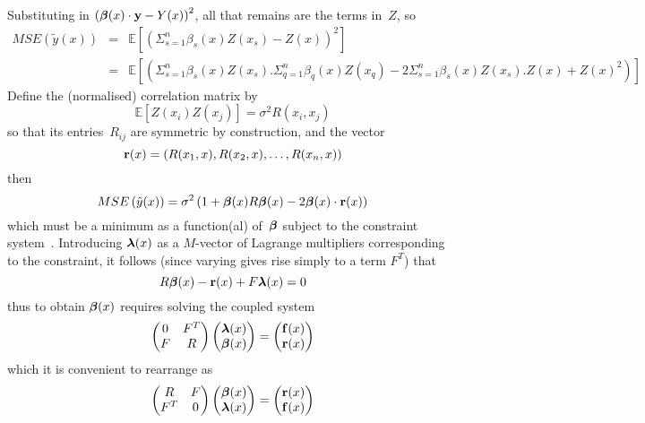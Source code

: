 Substituting  in $\left( \mbox{\boldmath ${\beta}$}(x)\cdot{\bf y} - Y(x) \right)^2$, all that remains are the
terms in~$Z$, so
\begin{eqnarray}
MSE\left(\tilde{y}(x)\right) &=& \mathbb{E} [ \left( \Sigma^n_{s=1} \beta_s(x) Z(x_s) - Z(x) \right)^2 ] \\
&=& \mathbb{E} [ \left( \Sigma^n_{s=1} \beta_s(x) Z(x_s) . \Sigma^n_{q=1} \beta_q(x) Z(x_q) -2 \Sigma^n_{s=1} \beta_s(x) Z(x_s) . Z(x) + Z(x)^2 \right) ] 
\end{eqnarray}
Define the (normalised) correlation matrix by
\begin{equation}
\mathbb{E} [ Z(x_i) Z(x_j) ]= \sigma^2 R(x_i,x_j) 
\end{equation}
so that its entries~$R_{ij}$ are symmetric by construction, and the vector
\begin{equation}
{\bf r}(x)=\left( R(x_1,x), R(x_2,x),\ldots,R(x_n,x) \right)
\end{equation}
then
\begin{equation}\label{eq:msend}
MSE\left(\tilde{y}(x)\right) = \sigma^2\left(1+ \mbox{\boldmath ${\beta}$}(x) R \mbox{\boldmath ${\beta}$}(x) - 2 \mbox{\boldmath ${\beta}$}(x)\cdot{\bf r}(x) \right) 
\end{equation}
which must be a minimum as a function(al) of~$\mbox{\boldmath ${\beta}$}$ subject to the constraint system~.
Introducing $\mbox{\boldmath ${\lambda}$}(x)$ as a $M$-vector of Lagrange multipliers corresponding to the constraint,
it follows (since varying  gives rise simply to a term $F^T$) that
\begin{equation}\label{eq:mat2}
R \mbox{\boldmath ${\beta}$}(x) -{\bf r}(x) + F \mbox{\boldmath ${\lambda}$}(x)=0
\end{equation}
thus to obtain $\mbox{\boldmath ${\beta}$}(x)$ requires solving the coupled system
\begin{equation}\label{eq:endsm}
\begin{pmatrix}
0 & F^T \\
F & R
\end{pmatrix}
\begin{pmatrix}
\mbox{\boldmath ${\lambda}$}(x) \\
\mbox{\boldmath ${\beta}$}(x)
\end{pmatrix}
=
\begin{pmatrix}
{\bf f}(x) \\
{\bf r}(x)
\end{pmatrix}
\end{equation}
which it is convenient to rearrange as
\begin{equation}\label{eq:endsmt}
\begin{pmatrix}
R & F \\
F^T & 0
\end{pmatrix}
\begin{pmatrix}
\mbox{\boldmath ${\beta}$}(x) \\
\mbox{\boldmath ${\lambda}$}(x)
\end{pmatrix}
=
\begin{pmatrix}
{\bf r}(x) \\
{\bf f}(x)
\end{pmatrix}
\end{equation}

